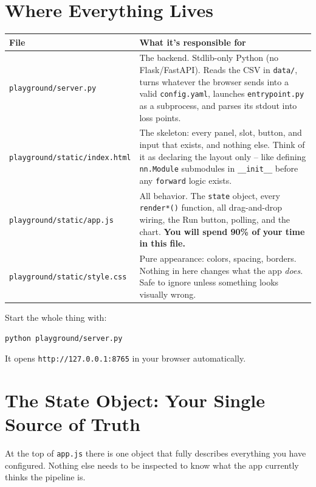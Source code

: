 \documentclass[11pt]{article}
\begin{document}
\section{Where Everything Lives}

\begin{center}
\begin{tabular}{@{}p{}p{}@{}}
\toprule
\textbf{File} & \textbf{What it's responsible for} \\
\midrule
\lstinline{playground/server.py} &
The backend. Stdlib-only Python (no Flask/FastAPI). Reads the CSV in
\lstinline{data/}, turns whatever the browser sends into a valid
\lstinline{config.yaml}, launches \lstinline{entrypoint.py} as a subprocess,
and parses its stdout into loss points. \\
\addlinespace
\lstinline{playground/static/index.html} &
The skeleton: every panel, slot, button, and input that exists, and nothing
else. Think of it as declaring the layout only -- like defining
\lstinline{nn.Module} submodules in \lstinline{__init__} before any
\lstinline{forward} logic exists. \\
\addlinespace
\lstinline{playground/static/app.js} &
All behavior. The \lstinline{state} object, every
\lstinline{render*()} function, all drag-and-drop wiring, the Run button,
polling, and the chart. \textbf{You will spend 90\% of your time in this
file.} \\
\addlinespace
\lstinline{playground/static/style.css} &
Pure appearance: colors, spacing, borders. Nothing in here changes what the
app \emph{does}. Safe to ignore unless something looks visually wrong. \\
\bottomrule
\end{tabular}
\end{center}

Start the whole thing with:
\begin{lstlisting}
python playground/server.py
\end{lstlisting}
It opens \lstinline{http://127.0.0.1:8765} in your browser automatically.

\section{The State Object: Your Single Source of Truth}

At the top of \lstinline{app.js} there is one object that fully describes
everything you have configured. Nothing else needs to be inspected to know
what the app currently thinks the pipeline is.
\end{document}
